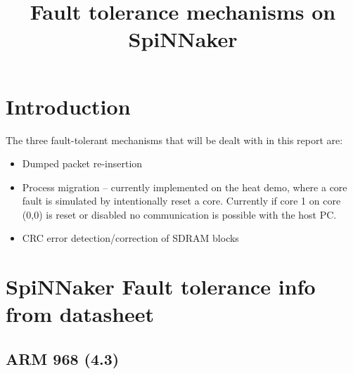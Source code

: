 \documentclass[12pt]{article}
\title{Fault tolerance mechanisms on SpiNNaker}
\begin{document}
\maketitle



\section{Introduction}
The three fault-tolerant mechanisms that will be dealt with in this report are:
\begin{itemize}
\item Dumped packet re-insertion
\item Process migration -- currently implemented on the heat demo, where a core fault is simulated by intentionally reset a core. Currently if core 1 on core (0,0) is reset or disabled no communication is possible with the host PC.
\item CRC error detection/correction of SDRAM blocks
\end{itemize}
	


\section{SpiNNaker Fault tolerance info from datasheet}
\subsection{ARM 968 (4.3)}
\end{document}
